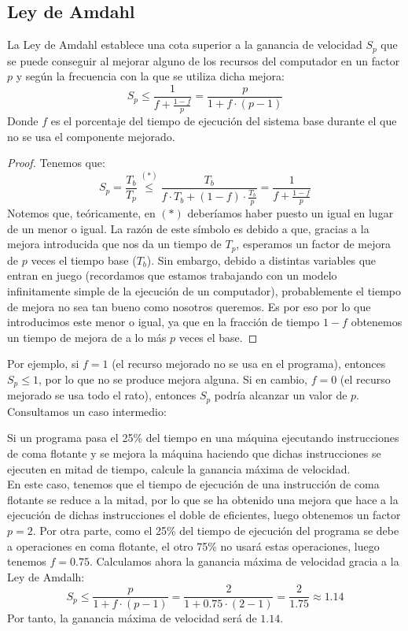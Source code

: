 \subsection{Ley de Amdahl}
La Ley de Amdahl establece una cota superior a la ganancia de velocidad $S_p$ que se puede conseguir al mejorar alguno de los recursos del computador en un factor $p$ y según la frecuencia con la que se utiliza dicha mejora:
\begin{equation}
    S_p \leq \frac{1}{f+\frac{1-f}{p}} =  \dfrac{p}{1+f\cdot (p-1)}
\end{equation}
Donde $f$ es el porcentaje del tiempo de ejecución del sistema base durante el que no se usa el componente mejorado.
\begin{proof}
    Tenemos que:
    \begin{equation*}
        S_p = \dfrac{T_b}{T_p} \stackrel{(\ast)}{\leq} \dfrac{T_b}{f\cdot T_b + (1-f)\cdot \frac{T_b}{p}} = \dfrac{1}{f + \frac{1-f}{p}}
    \end{equation*}
    Notemos que, teóricamente, en $(\ast)$ deberíamos haber puesto un igual en lugar de un menor o igual. La razón de este símbolo es debido a que, gracias a la mejora introducida que nos da un tiempo de $T_p$, esperamos un factor de mejora de $p$ veces el tiempo base ($T_b$). Sin embargo, debido a distintas variables que entran en juego (recordamos que estamos trabajando con un modelo infinitamente simple de la ejecución de un computador), probablemente el tiempo de mejora no sea tan bueno como nosotros queremos. Es por eso por lo que introducimos este menor o igual, ya que en la fracción de tiempo $1-f$ obtenemos un tiempo de mejora de a lo más $p$ veces el base.
\end{proof}


Por ejemplo, si $f = 1$ (el recurso mejorado no se usa en el programa), entonces $S_p \leq 1$, por lo que no se produce mejora alguna. Si en cambio, $f = 0$ (el recurso mejorado se usa todo el rato), entonces $S_p$ podría alcanzar un valor de $p$. Consultamos un caso intermedio:

\begin{ejemplo}
    Si un programa pasa el 25\% del tiempo en una máquina ejecutando instrucciones de coma flotante y se mejora la máquina haciendo que dichas instrucciones se ejecuten en mitad de tiempo, calcule la ganancia máxima de velocidad.\\

    En este caso, tenemos que el tiempo de ejecución de una instrucción de coma flotante se reduce a la mitad, por lo que se ha obtenido una mejora que hace a la ejecución de dichas instrucciones el doble de eficientes, luego obtenemos un factor $p = 2$. Por otra parte, como el 25\% del tiempo de ejecución del programa se debe a operaciones en coma flotante, el otro 75\% no usará estas operaciones, luego tenemos $f = 0.75$. Calculamos ahora la ganancia máxima de velocidad gracia a la Ley de Amdalh:
    \begin{equation*}
        S_p \leq \dfrac{p}{1+f\cdot(p-1)} = \dfrac{2}{1+0.75\cdot(2-1)}= \dfrac{2}{1.75} \approx 1.14
    \end{equation*}
    Por tanto, la ganancia máxima de velocidad será de $1.14$.
\end{ejemplo}

